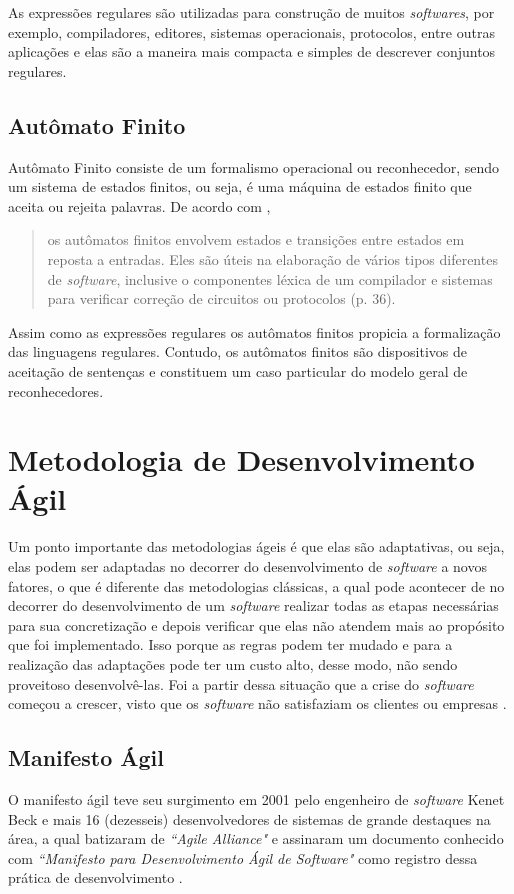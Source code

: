 {{As expressões regulares são utilizadas para construção de muitos \textit{softwares}, por exemplo, compiladores, editores, sistemas operacionais, protocolos, entre outras aplicações e elas são a maneira mais compacta e simples de descrever conjuntos regulares.

\subsection{Autômato Finito}
\noindent Autômato Finito consiste de um formalismo operacional ou reconhecedor, sendo um sistema de estados finitos, ou seja, é uma máquina de estados finito que aceita ou rejeita palavras. De acordo com \cite{2002:John}, 
\begin{quote}
    os autômatos finitos envolvem estados e transições entre estados em reposta a entradas. Eles são úteis na elaboração de vários tipos diferentes de \textit{software}, inclusive o componentes léxica de um compilador e sistemas para verificar correção de circuitos ou protocolos (p. 36).
\end{quote}

Assim como as expressões regulares os autômatos finitos propicia a formalização das linguagens regulares. Contudo, os autômatos finitos são dispositivos de aceitação de sentenças e constituem um caso particular do modelo geral de reconhecedores.

\section{Metodologia de Desenvolvimento Ágil}
\noindent Um ponto importante das metodologias ágeis é que elas são adaptativas, ou seja, elas podem ser adaptadas no decorrer do desenvolvimento de \textit{software} a novos fatores, o que é diferente das metodologias clássicas, a qual pode acontecer de no decorrer do desenvolvimento de um \textit{software} realizar todas as etapas necessárias para sua concretização e depois verificar que elas não atendem mais ao propósito que foi implementado. Isso porque as regras podem ter mudado e para a realização das adaptações pode ter um custo alto, desse modo, não sendo proveitoso desenvolvê-las. Foi a partir dessa situação que a crise do \textit{software} começou a crescer, visto que os \textit{software} não satisfaziam os clientes ou empresas \cite{2005:rezende}.

\subsection{Manifesto Ágil}
\noindent O manifesto ágil teve seu surgimento em 2001 pelo engenheiro de \textit{software} Kenet Beck e mais 16 (dezesseis) desenvolvedores de sistemas de grande destaques na área, a qual batizaram de \textit{``Agile Alliance"} e assinaram um documento conhecido com \textit{``Manifesto para Desenvolvimento Ágil de \textit{Software}"} como registro dessa prática de desenvolvimento \cite{2001:Pressman}.

}}
